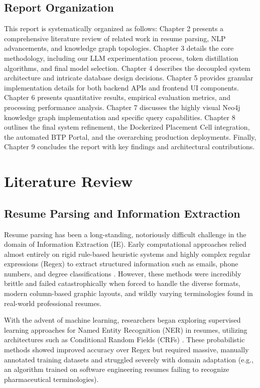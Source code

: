 \documentclass[12pt,a4paper]{report}
\begin{document}
\section{Report Organization}

This report is systematically organized as follows: Chapter 2 presents a comprehensive literature review of related work in resume parsing, NLP advancements, and knowledge graph topologies. Chapter 3 details the core methodology, including our LLM experimentation process, token distillation algorithms, and final model selection. Chapter 4 describes the decoupled system architecture and intricate database design decisions. Chapter 5 provides granular implementation details for both backend APIs and frontend UI components. Chapter 6 presents quantitative results, empirical evaluation metrics, and processing performance analysis. Chapter 7 discusses the highly visual Neo4j knowledge graph implementation and specific query capabilities. Chapter 8 outlines the final system refinement, the Dockerized Placement Cell integration, the automated BTP Portal, and the overarching production deployments. Finally, Chapter 9 concludes the report with key findings and architectural contributions.

\chapter{Literature Review}

\section{Resume Parsing and Information Extraction}

Resume parsing has been a long-standing, notoriously difficult challenge in the domain of Information Extraction (IE). Early computational approaches relied almost entirely on rigid rule-based heuristic systems and highly complex regular expressions (Regex) to extract structured information such as emails, phone numbers, and degree classifications \cite{resume-parsing-survey}. However, these methods were incredibly brittle and failed catastrophically when forced to handle the diverse formats, modern column-based graphic layouts, and wildly varying terminologies found in real-world professional resumes.

With the advent of machine learning, researchers began exploring supervised learning approaches for Named Entity Recognition (NER) in resumes, utilizing architectures such as Conditional Random Fields (CRFs) \cite{ner-resumes}. These probabilistic methods showed improved accuracy over Regex but required massive, manually annotated training datasets and struggled severely with domain adaptation (e.g., an algorithm trained on software engineering resumes failing to recognize pharmaceutical terminologies).
\end{document}
